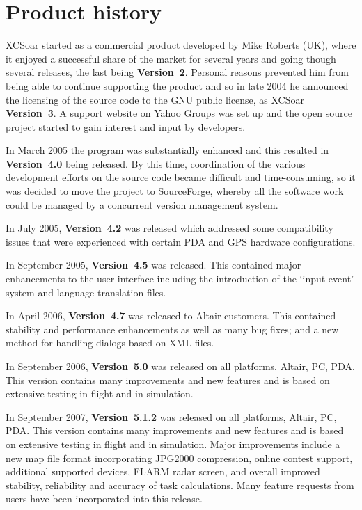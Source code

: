 \documentclass[a4paper,12pt]{refrep}
\begin{document}
\section{Product history}
%
XCSoar started as a commercial product developed by Mike Roberts (UK),
where it enjoyed a successful share of the market for several years
and going though several releases, the last being {\bf Version~2}.
Personal reasons prevented him from being able to continue supporting
the product and so in late 2004 he announced the licensing of the
source code to the GNU public license, as XCSoar {\bf Version~3}.  A support
website on Yahoo Groups was set up and the open source project started
to gain interest and input by developers.

In March 2005 the program was substantially enhanced and this resulted 
in {\bf Version~4.0} being released.  By this time, coordination of
the various development efforts on the source code became difficult
and time-consuming, so it was decided to move the project to
SourceForge, whereby all the software work could be managed by a
concurrent version management system.

In July 2005, {\bf Version~4.2} was released which addressed some
compatibility issues that were experienced with certain PDA and GPS
hardware configurations.

In September 2005, {\bf Version~4.5} was released.  This contained
major enhancements to the user interface including the introduction
of the `input event' system and language translation files.

In April 2006, {\bf Version~4.7} was released to Altair customers.
This contained stability and performance enhancements as well as many
bug fixes; and a new method for handling dialogs based on XML files.

In September 2006, {\bf Version~5.0} was released on all platforms,
Altair, PC, PDA.  This version contains many improvements and new
features and is based on extensive testing in flight and in
simulation.

In September 2007, {\bf Version~5.1.2} was released on all platforms,
Altair, PC, PDA.  This version contains many improvements and new
features and is based on extensive testing in flight and in
simulation.  Major improvements include a new map file format
incorporating JPG2000 compression, online contest support, additional
supported devices, FLARM radar screen, and overall improved stability,
reliability and accuracy of task calculations.  Many feature requests
from users have been incorporated into this release.
\end{document}
